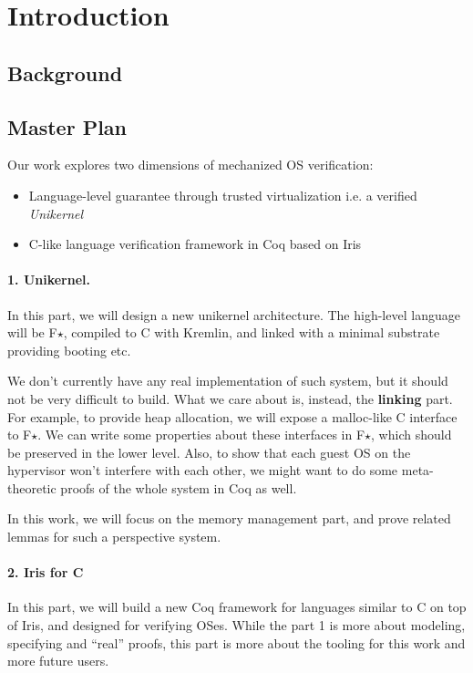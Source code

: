 \section{Introduction}
\label{sec:intro}

\subsection{Background}

\subsection{Master Plan}

Our work explores two dimensions of mechanized OS verification:

\begin{itemize}
\item Language-level guarantee through trusted virtualization i.e. a verified \emph{Unikernel}
\item C-like language verification framework in Coq based on Iris
\end{itemize}

\paragraph{1. Unikernel.} In this part, we will design a new unikernel architecture. The high-level
language will be F$\star$, compiled to C with Kremlin,
and linked with a minimal substrate providing booting etc.

We don't currently have any real implementation of such system, but it should not be very difficult to build.
What we care about is, instead, the \textbf{linking} part.
For example, to provide heap allocation, we will expose a malloc-like C interface to F$\star$. We can write
some properties about these interfaces in F$\star$, which should be preserved in the lower level. Also, to show
that each guest OS on the hypervisor won't interfere with each other, we might want to do some meta-theoretic proofs
of the whole system in Coq as well.

In this work, we will focus on the memory management part,
and prove related lemmas for such a perspective system.

\paragraph{2. Iris for C} In this part, we will build a new Coq framework for languages similar to C on top of Iris,
and designed for verifying OSes. While the part 1 is more about modeling, specifying and ``real'' proofs, this
part is more about the tooling for this work and more future users.

